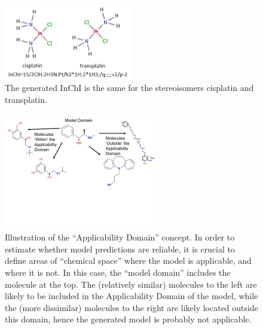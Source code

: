\documentclass{sig-alternate}
\begin{document}
%
\begin{figure}
\centering
\includegraphics[height=1.3in]{platins.png}
\caption{The generated InChI is the same for the stereoisomers cisplatin and transplatin.}
\label{figure:cistrans}
\end{figure}
%
\begin{figure}
\centering
\includegraphics[height=2in]{CACM_ApplicabilityDomain.pdf}
\caption{Illustration of the ``Applicability Domain'' concept. In order to estimate whether model predictions are reliable, it is crucial to define areas of ``chemical space'' where the model is applicable, and where it is not. In this case, the ``model domain'' includes the molecule at the top. The (relatively similar) molecules to the left are likely to be included in the Applicability Domain of the model, while the (more dissimilar) molecules to the right are likely located outside this domain, hence the generated model is probably not applicable.}
\label{figure:applicability-domain}
\end{figure}
%
\end{document}
